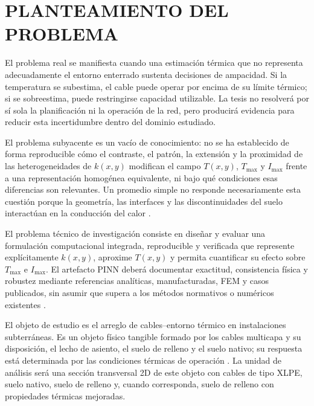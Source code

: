 \documentclass[11pt,a4paper,oneside]{report}
\newcommand{\Tmax}{T_{\max}}
\newcommand{\Imax}{I_{\max}}
\newcommand{\kx}{k(x,y)}
\begin{document}

\section{PLANTEAMIENTO DEL PROBLEMA}
\label{sec:planteamiento-problema}

El problema real se manifiesta cuando una estimación térmica que no representa adecuadamente el entorno enterrado sustenta decisiones de ampacidad. Si la temperatura se subestima, el cable puede operar por encima de su límite térmico; si se sobreestima, puede restringirse capacidad utilizable. La tesis no resolverá por sí sola la planificación ni la operación de la red, pero producirá evidencia para reducir esta incertidumbre dentro del dominio estudiado.

El problema subyacente es un vacío de conocimiento: no se ha establecido de forma reproducible cómo el contraste, el patrón, la extensión y la proximidad de las heterogeneidades de $\kx$ modifican el campo $T(x,y)$, $\Tmax$ y $\Imax$ frente a una representación homogénea equivalente, ni bajo qué condiciones esas diferencias son relevantes. Un promedio simple no responde necesariamente esta cuestión porque la geometría, las interfaces y las discontinuidades del suelo interactúan en la conducción del calor \parencites[4--6]{enescu2021}[3--4,93--99]{cigre2025}.

El problema técnico de investigación consiste en diseñar y evaluar una formulación computacional integrada, reproducible y verificada que represente explícitamente $\kx$, aproxime $T(x,y)$ y permita cuantificar su efecto sobre $\Tmax$ e $\Imax$. El artefacto PINN deberá documentar exactitud, consistencia física y robustez mediante referencias analíticas, manufacturadas, FEM y casos publicados, sin asumir que supera a los métodos normativos o numéricos existentes \parencites{iec60287}{iec60853}[3--4,93--99]{cigre2025}[686--690]{raissi2019}.

El objeto de estudio es el arreglo de cables--entorno térmico en instalaciones subterráneas. Es un objeto físico tangible formado por los cables multicapa y su disposición, el lecho de asiento, el suelo de relleno y el suelo nativo; su respuesta está determinada por las condiciones térmicas de operación \parencites[3--6]{enescu2021}{ieee442}[1,10]{kim2025}. La unidad de análisis será una sección transversal 2D de este objeto con cables de tipo XLPE, suelo nativo, suelo de relleno y, cuando corresponda, suelo de relleno con propiedades térmicas mejoradas.
\end{document}
